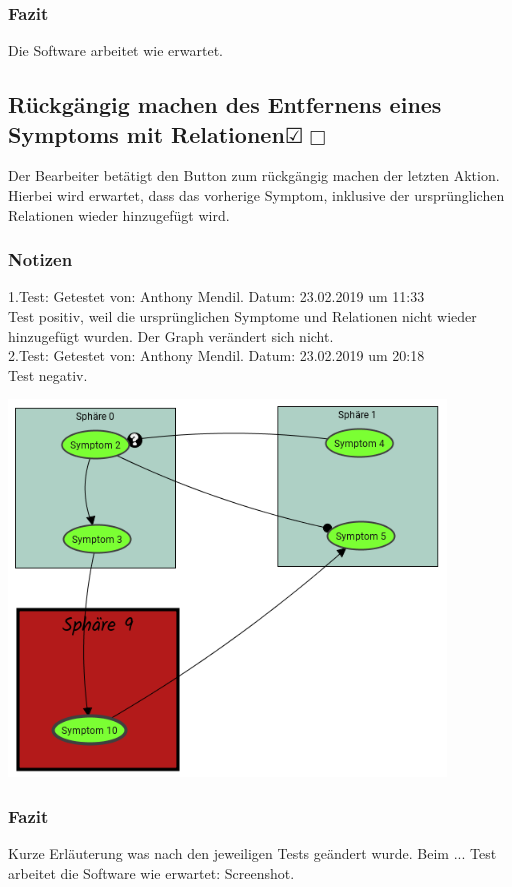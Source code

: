 \documentclass{scrartcl}
\newcommand{\subsectiont}[2]{\subsection[#1]{#1{\normalsize\normalfont #2}}}
\newcommand{\leer}{$\Box$}
\newcommand{\ok}{$\CheckedBox$}
\begin{document}
\subsubsection{Fazit}
Die Software arbeitet wie erwartet. 

\subsectiont{Rückgängig machen des Entfernens eines \\Symptoms mit Relationen}{\dotfill\XBox\ok\leer}
Der Bearbeiter betätigt den Button zum rückgängig machen der letzten Aktion. Hierbei wird erwartet, dass das vorherige Symptom, inklusive der ursprünglichen Relationen wieder hinzugefügt wird. 
\subsubsection{Notizen}
1.Test: Getestet von: Anthony Mendil. Datum: 23.02.2019 um 11:33 \\
Test positiv, weil die ursprünglichen Symptome und Relationen nicht wieder hinzugefügt wurden. Der Graph verändert sich nicht. \\
2.Test: Getestet von: Anthony Mendil. Datum: 23.02.2019 um 20:18 \\
Test negativ.
\begin{center}
\includegraphics[height=10cm]{2_21.PNG}
\end{center}
\subsubsection{Fazit}
Kurze Erläuterung was nach den jeweiligen Tests geändert wurde. Beim ... Test arbeitet die Software wie erwartet: Screenshot. 
\end{document}
